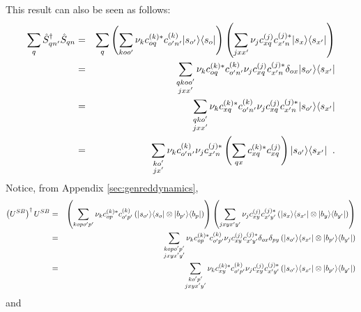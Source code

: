 This result can also be seen as follows:
\begin{eqnarray*}
\sum_q \hat{S}_{qn^\prime}^\dagger \hat{S}_{qn} &=& \sum_q \left(\sum_{koo^\prime} \nu_k c_{oq}^{(k)*} c_{o^\prime n^\prime}^{(k)} |s_{o^\prime}\rangle\langle s_{o}|\right)\left(\sum_{jxx^\prime} \nu_j c_{xq}^{(j)} c_{x^\prime n}^{(j)*} |s_x\rangle\langle s_{x^\prime}|\right)\\
&=& \sum_{\substack{qkoo^\prime\\jxx^\prime}} \nu_k c_{oq}^{(k)*} c_{o^\prime n^\prime}^{(k)}\nu_j c_{xq}^{(j)} c_{x^\prime n}^{(j)*} \delta_{ox} |s_{o^\prime}\rangle\langle s_{x^\prime}|\\
&=& \sum_{\substack{qko^\prime\\jxx^\prime}} \nu_k c_{xq}^{(k)*} c_{o^\prime n^\prime}^{(k)}\nu_j c_{xq}^{(j)} c_{x^\prime n}^{(j)*} |s_{o^\prime}\rangle\langle s_{x^\prime}|\\
&=& \sum_{\substack{ko^\prime\\jx^\prime}} \nu_k  c_{o^\prime n^\prime}^{(k)}\nu_j c_{x^\prime n}^{(j)*} \left(\sum_{qx} c_{xq}^{(k)*}  c_{xq}^{(j)} \right) |s_{o^\prime}\rangle\langle s_{x^\prime}|\;\;.
\end{eqnarray*}
Notice, from Appendix \ref{sec:genreddynamics},
\begin{eqnarray*}
\left(U^{SB}\right)^\dagger U^{SB} &=& \left(\sum_{kopo^\prime p^\prime} \nu_k c_{op}^{(k)*}c_{o^\prime p^\prime}^{(k)} \left(|s_{o^\prime} \rangle\langle s_{o} | \otimes |b_{p^\prime} \rangle\langle b_{p} |\right)\right)\left(\sum_{jxyx^\prime y^\prime} \nu_j c_{xy}^{(j)}c_{x^\prime y^\prime}^{(j)*}\left( |s_x\rangle\langle s_{x^\prime}| \otimes |b_y\rangle\langle b_{y^\prime}|\right)\right)\\
&=& \sum_{\substack{kopo^\prime p^\prime\\jxyx^\prime y^\prime}} \nu_k c_{op}^{(k)*}c_{o^\prime p^\prime}^{(k)}\nu_j c_{xy}^{(j)}c_{x^\prime y^\prime}^{(j)*}\delta_{ox}\delta_{py}\left(|s_{o^\prime}\rangle\langle s_{x^\prime}|\otimes|b_{p^\prime}\rangle\langle b_{y^\prime}|\right)\\
&=& \sum_{\substack{ko^\prime p^\prime\\jxyx^\prime y^\prime}} \nu_k c_{xy}^{(k)*}c_{o^\prime p^\prime}^{(k)}\nu_j c_{xy}^{(j)}c_{x^\prime y^\prime}^{(j)*}\left(|s_{o^\prime}\rangle\langle s_{x^\prime}|\otimes|b_{p^\prime}\rangle\langle b_{y^\prime}|\right)\\
\end{eqnarray*}
and
